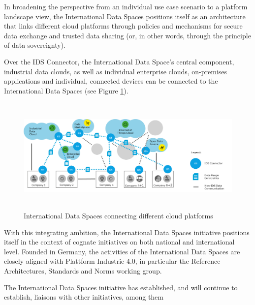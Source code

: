 In broadening the perspective from an individual use case scenario to a platform landscape view, the International Data Spaces positions itself as an architecture that links different cloud platforms through policies and mechanisms for secure data exchange and trusted data sharing (or, in other words, through the principle of data sovereignty).\

Over the IDS Connector, the International Data Space’s central component, industrial data clouds, as well as individual enterprise clouds, on-premises applications and individual, connected devices can be connected to the International Data Spaces (see Figure \ref{fig:6_International_Data_Spaces_connecting_different_cloud_platforms}).




\begin{figure}[h]
	\begin{Center}
		\includegraphics[width=6.42in,height=2.25in]{./media/image17.png}
		\caption{ International Data Spaces connecting different cloud platforms}
		\label{fig:6_International_Data_Spaces_connecting_different_cloud_platforms}
	\end{Center}
\end{figure}



With this integrating ambition, the International Data Spaces initiative positions itself in the context of cognate initiatives on both national and international level. Founded in Germany, the activities of the International Data Spaces are closely aligned with Plattform Industrie 4.0, in particular the Reference Architectures, Standards and Norms working group. 

The International Data Spaces initiative has established, and will continue to establish, liaisons with other initiatives, among them

